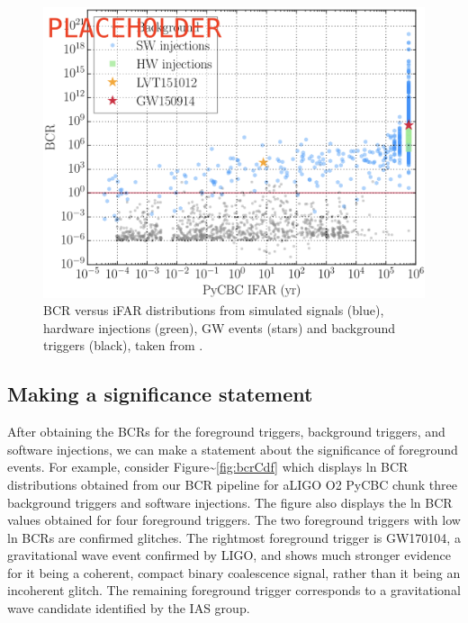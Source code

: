 \documentclass[%
 reprint,
 amsmath,amssymb,
 aps,
]{revtex4}
\begin{document}
\begin{figure}[!h]

{\centering \includegraphics[width=0.75\linewidth]{images/bcr_ifar} 

}

\caption[BCR vs iFAR for O1]{BCR versus iFAR distributions from simulated signals (blue), hardware injections (green), GW events (stars) and background triggers (black), taken from \citet{bcr_paper}.}\label{fig:bcrIfar}
\end{figure}

\hypertarget{making-a-significance-statement}{%
\subsection{Making a significance statement}\label{making-a-significance-statement}}

After obtaining the BCRs for the foreground triggers, background triggers, and software injections, we can make a
statement about the significance of foreground events. For example, consider Figure\textasciitilde\ref{fig:bcrCdf} which displays ln
BCR distributions obtained from our BCR pipeline for aLIGO O2 PyCBC chunk three background triggers and software injections.
The figure also displays the ln BCR values obtained for four foreground triggers. The two foreground triggers with low
ln BCRs are confirmed glitches. The rightmost foreground trigger is GW170104, a gravitational wave event confirmed by
LIGO, and shows much stronger evidence for it being a coherent, compact binary coalescence signal, rather than it being
an incoherent glitch. The remaining foreground trigger corresponds to a gravitational wave candidate identified by the
IAS group.
\end{document}
